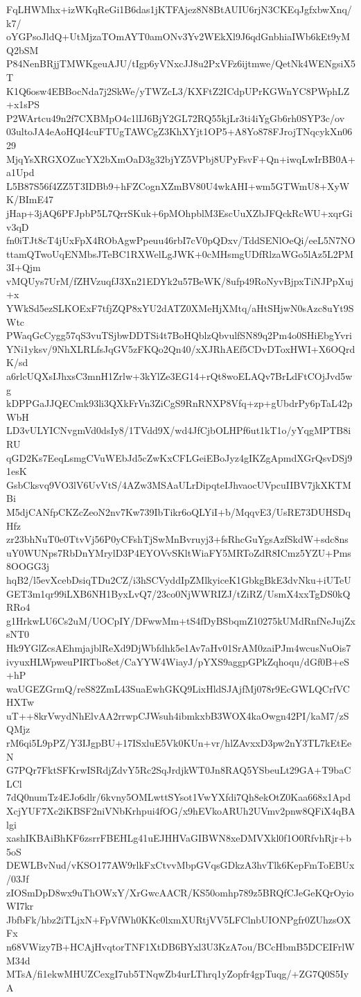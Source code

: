 FqLHWMhx+izWKqReGi1B6das1jKTFAjez8N8BtAUIU6rjN3CKEqJgfxbwXnq/k7/
oYGPsoJldQ+UtMjzaTOmAYT0amONv3Yv2WEkXl9J6qdGnbhiaIWb6kEt9yMQ2bSM
P84NenBRjjTMWKgeuAJU/tIgp6yVNxcJJ8u2PxVFz6ijtmwe/QetNk4WENgsiX5T
K1Q6osw4EBBocNda7j2SkWe/yTWZcL3/KXFtZ2ICdpUPrKGWnYC8PWphLZ+x1sPS
P2WArtcu49n2f7CXBMpO4c1lIJ6BjY2GL72RQ55kjLr3ti4iYgGb6rh0SYP3c/ov
03ultoJA4eAoHQI4cuFTUgTAWCgZ3KhXYjt1OP5+A8Yo878FJrojTNqcykXn0629
MjqYsXRGXOZucYX2bXmOaD3g32bjYZ5VPbj8UPyFsvF+Qn+iwqLwIrBB0A+a1Upd
L5B87S56f4ZZ5T3IDBb9+hFZCognXZmBV80U4wkAHI+wm5GTWmU8+XyWK/BImE47
jHap+3jAQ6PFJpbP5L7QrrSKuk+6pMOhpblM3EscUuXZbJFQckRcWU+xqrGiv3qD
fn0iTJt8cT4jUxFpX4RObAgwPpeuu46rbI7cV0pQDxv/TddSENlOeQi/eeL5N7NO
ttamQTwoUqENMbsJTeBC1RXWelLgJWK+0cMHsmgUDfRlzaWGo5lAz5L2PM3I+Qjm
vMQUys7UrM/fZHVzuqfJ3Xn21EDYk2u57BeWK/8ufp49RoNyvBjpxTiNJPpXuj+x
YWkSd5ezSLKOExF7tfjZQP8xYU2dATZ0XMeHjXMtq/aHtSHjwN0sAzc8uYt9SWtc
PWaqGcCygg57qS3vuTSjbwDDTSi4t7BoHQblzQbvulfSN89q2Pm4o0SHiEbgYvri
YNi1yksv/9NhXLRLfsJqGV5zFKQo2Qn40/xXJRhAEf5CDvDToxHWI+X6OQrdK/sd
a6rlcUQXsIJhxsC3mnH1Zrlw+3kYlZe3EG14+rQt8woELAQv7BrLdFtCOjJvd5wg
kDPPGaJJQECmk93li3QXkFrVn3ZiCgS9RnRNXP8Vfq+zp+gUbdrPy6pTaL42pWbH
LD3vULYICNvgmVd0dsIy8/1TVdd9X/wd4JfCjbOLHPf6ut1kT1o/yYqgMPTB8iRU
qGD2Ks7EeqLsmgCVuWEbJd5cZwKxCFLGeiEBoJyz4gIKZgApmdXGrQsvDSj91esK
GsbCksvq9VO3lV6UvVtS/4AZw3MSAaULrDipqteIJhvaocUVpcuIIBV7jkXKTMBi
M5djCANfpCKZcZeoN2nv7Kw739IbTikr6oQLYiI+b/MqqvE3/UsRE73DUHSDqHfz
zr23bhNuT0e0TtvVj56P0yCFshTjSwMnBvruyj3+fsRhcGuYgsAzfSkdW+sdc8ns
uY0WUNps7RbDnYMrylD3P4EYOVvSKltWiaFY5MRToZdR8ICmz5YZU+Pms8OOGG3j
hqB2/l5evXcebDsiqTDu2CZ/i3hSCVyddIpZMlkyiceK1GbkgBkE3dvNku+iUTeU
GET3m1qr99iLXB6NH1ByxLvQ7/23co0NjWWRIZJ/tZiRZ/UsmX4xxTgDS0kQRRo4
g1HrkwLU6Cs2uM/UOCpIY/DFwwMm+tS4fDyBSbqmZ10275kUMdRnfNeJujZxsNT0
Hk9YGlZcsAEhmjajblReXd9DjWbfdhk5e1Av7aHv01SrAM0zaiPJm4wcusNuOis7
ivyuxHLWpweuPIRTbo8et/CaYYW4WiayJ/pYXS9aggpGPkZqhoqu/dGf0B+eS+hP
waUGEZGrmQ/reS82ZmL43SuaEwhGKQ9LixHldSJAjfMj078r9EcGWLQCrfVCHXTw
uT++8krVwydNhElvAA2rrwpCJWsuh4ibmkxbB3WOX4kaOwgn42PI/kaM7/zSQMjz
rM6qi5L9pPZ/Y3IJgpBU+17ISxluE5Vk0KUn+vr/hlZAvxxD3pw2nY3TL7kEtEeN
G7PQr7FktSFKrwISRdjZdvY5Rc2SqJrdjkWT0Jn8RAQ5YSbeuLt29GA+T9baCLCl
7dQ0numTz4EJo6dlr/6kvny5OMLwttSYsot1VwYXfdi7Qh8ekOtZ0Kaa668x1Apd
XcjYUF7Xc2iKBSF2niVNbKrhpui4fOG/x9hEVkoARUh2UVmv2pnw8QFiX4qBAlgi
xashIKBAiBhKF6zsrrFBEHLg41uEJHHVaGIBWN8xeDMVXkl0f1O0RfvhRjr+b5oS
DEWLBvNud/vKSO177AW9rlkFxCtvvMbpGVqsGDkzA3hvTlk6KepFmToEBUx/03Jf
zIOSmDpD8wx9uThOWxY/XrGwcAACR/KS50omhp789z5BRQfCJeGeKQrOyioWI7kr
JbfbFk/hbz2iTLjxN+FpVfWh0KKc0lxmXURtjVV5LFClnbUIONPgfr0ZUhzsOXFx
n68VWizy7B+HCAjHvqtorTNF1XtDB6BYxl3U3KzA7ou/BCcHbmB5DCEIFrlWM34d
MTsA/fi1ekwMHUZCexgI7ub5TNqwZb4urLThrq1yZopfr4gpTuqg/+ZG7Q0S5IyA
